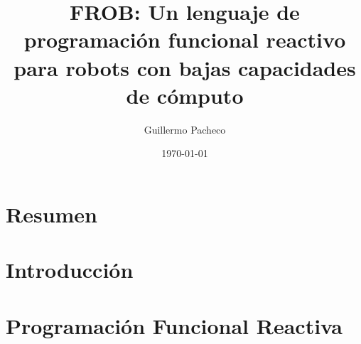 \documentclass[12pt,a4paper,spanish]{book}
\begin{document}
\title{FROB: Un lenguaje de programación funcional reactivo para robots con bajas capacidades de cómputo}
\author{Guillermo Pacheco}
\date{\today}

\maketitle


\chapter*{Resumen}



\cleardoublepage
{} %
\tableofcontents

\cleardoublepage
{} %
\listoffigures

\cleardoublepage
{} %
\listoftables


\chapter{Introducción}


\chapter{Programación Funcional Reactiva}


%

%

%
\end{document}
